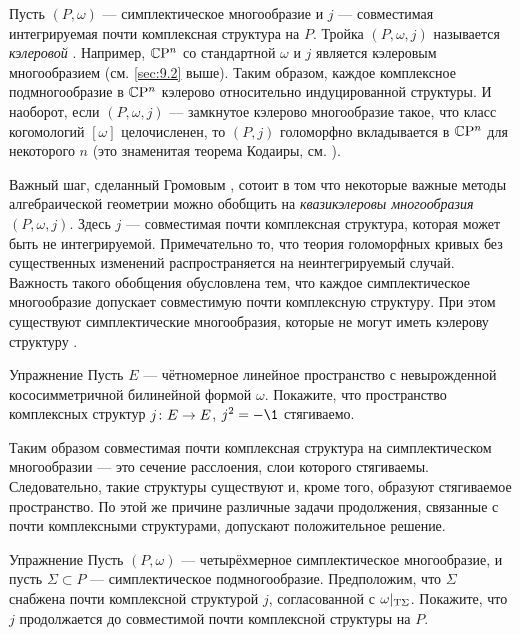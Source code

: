 Пусть $(P, \omega)$ --- симплектическое многообразие и $j$ --- совместимая интегрируемая почти комплексная структура на $P$.
Тройка $(P, \omega, j)$ называется \emph{кэлеровой} .
Например, $\mathbb{C}\mathrm{P}^n$ со стандартной $\omega$ и $j$ является кэлеровым многообразием (см. \ref{sec:9.2} выше).
Таким образом, каждое комплексное подмногообразие в $\mathbb{C}\mathrm{P}^n$ кэлерово относительно индуцированной структуры.
И наоборот, если $(P, \omega, j)$ --- замкнутое кэлерово многообразие такое, что класс когомологий $[\omega]$ целочисленен, то $(P, j)$ голоморфно вкладывается в $\mathbb{C}\mathrm{P}^n$ для некоторого $n$ (это знаменитая теорема Кодаиры, см. \cite{GH}).

Важный шаг, сделанный Громовым \cite{G1}, сотоит в том что некоторые важные методы алгебраической геометрии можно обобщить на \emph{квазикэлеровы многообразия} $(P, \omega, j)$.
Здесь $j$ --- совместимая почти комплексная структура, которая может быть не интегрируемой.
Примечательно то, что теория голоморфных кривых без существенных изменений распространяется на неинтегрируемый случай.
Важность такого обобщения обусловлена тем, что
каждое симплектическое многообразие допускает совместимую почти комплексную структуру.
При этом существуют симплектические многообразия, которые не могут иметь кэлерову структуру \cite{MS}.

\begin{ex}[\cite{MS}]{Упражнение}\label{10.2.B}
Пусть $E$ --- чётномерное линейное пространство с невырожденной кососимметричной билинейной формой $\omega$.
Покажите, что пространство комплексных структур $j\: E \z\to E$, $j^2 = -\1$ стягиваемо.
\end{ex}

Таким образом совместимая почти комплексная структура на симплектическом многообразии --- это сечение расслоения, слои которого стягиваемы.
Следовательно, такие структуры существуют и, кроме того, образуют стягиваемое пространство.
По этой же причине различные задачи продолжения, связанные с почти комплексными структурами, допускают положительное решение.

\begin{ex}{Упражнение}\label{10.2.С}
Пусть $(P, \omega)$ --- четырёхмерное симплектическое многообразие, и пусть $\Sigma \subset P$ --- симплектическое подмногообразие.
Предположим, что $\Sigma$ снабжена почти комплексной структурой $j$, согласованной с $\omega|_{\mathrm{T} \Sigma}$.
Покажите, что $j$ продолжается до совместимой почти комплексной структуры на $P$.
\end{ex}


